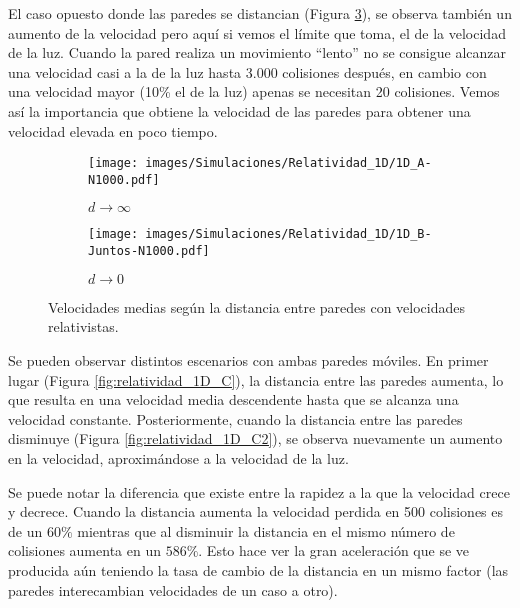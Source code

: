 \vspace{3mm}

El caso opuesto donde las paredes se distancian (Figura \ref{fig:relatividad_1D_B}), se observa también un aumento de la velocidad pero aquí si vemos el límite que toma, el de la velocidad de la luz. Cuando la pared realiza un movimiento ``lento'' no se consigue alcanzar una velocidad casi a la de la luz hasta 3.000 colisiones después, en cambio con una velocidad mayor (10\% el de la luz) apenas se necesitan 20 colisiones. Vemos así la importancia que obtiene la velocidad de las paredes para obtener una velocidad elevada en poco tiempo.

\vspace{3mm}

\begin{figure}[H]
    \begin{subfigure}[b]{0.5\textwidth}
        \centering
        \texttt{[image: images/Simulaciones/Relatividad\_1D/1D\_A-N1000.pdf]}
        \caption{$d \rightarrow \infty$}
        \label{fig:relatividad_1D_A}
    \end{subfigure}
    \hfill
    \begin{subfigure}[b]{0.5\textwidth}
        \centering
        \texttt{[image: images/Simulaciones/Relatividad\_1D/1D\_B-Juntos-N1000.pdf]}
        \caption{$d \rightarrow 0$}
        \label{fig:relatividad_1D_B}
    \end{subfigure}
    \caption{Velocidades medias según la distancia entre paredes con velocidades relativistas.}
\end{figure}

Se pueden observar distintos escenarios con ambas paredes móviles. En primer lugar (Figura \ref{fig:relatividad_1D_C}), la distancia entre las paredes aumenta, lo que resulta en una velocidad media descendente hasta que se alcanza una velocidad constante. Posteriormente, cuando la distancia entre las paredes disminuye (Figura \ref{fig:relatividad_1D_C2}), se observa nuevamente un aumento en la velocidad, aproximándose a la velocidad de la luz.

\vspace{3mm}

Se puede notar la diferencia que existe entre la rapidez a la que la velocidad crece y decrece. Cuando la distancia aumenta la velocidad perdida en 500 colisiones es de un \( 60\% \) mientras que al disminuir la distancia en el mismo número de colisiones aumenta en un \( 586\% \). Esto hace ver la gran aceleración que se ve producida aún teniendo la tasa de cambio de la distancia en un mismo factor (las paredes interecambian velocidades de un caso a otro).

